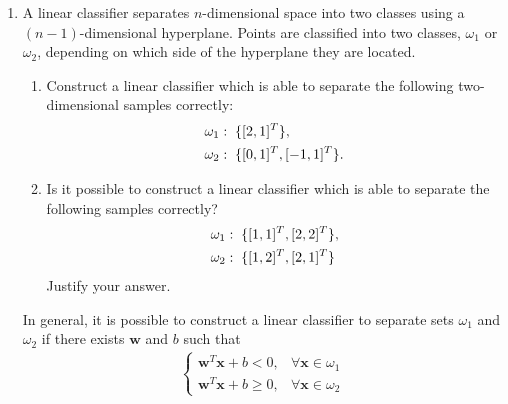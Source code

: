 \begin{enumerate}
\begin{solution}

  \end{solution}
  

\item A linear classifier separates $n$-dimensional
  space into two classes using a $(n-1)$-dimensional hyperplane. Points
  are classified into two classes, $\omega_1$ or $\omega_2$, depending on
  which side of the hyperplane they are located.
  \begin{enumerate}
  \item Construct a linear classifier which is able to separate the
    following two-dimensional samples correctly:
    \begin{align}
      &\omega_1: \text{\;} \{[2,1]^T\}, \notag \\
      &\omega_2: \text{\;} \{[0,1]^T, [-1,1]^T \}. \notag
    \end{align}
  \item Is it possible to construct a linear classifier which is able
    to separate the following samples correctly?
    \begin{align}
      &\omega_1:\text{\;} \{ [1,1]^T, [2,2]^T \}, \notag \\
      &\omega_2: \text{\;} \{ [1,2]^T,[2,1]^T \} \notag
    \end{align}
    Justify your answer.
  \end{enumerate}

  \begin{solution}

    In general, it is possible to construct a linear classifier to
    separate sets $\omega_1$ and $\omega_2$ if there exists
    $\mathbf{w}$ and $b$ such that
    \begin{align*}
      \begin{cases}
        \mathbf{w}^T\mathbf{x}+b<0, & \forall \mathbf{x} \in \omega_1
        \\
        \mathbf{w}^T\mathbf{x}+b\geq 0, & \forall \mathbf{x} \in \omega_2
      \end{cases}
    \end{align*}


\end{solution}
\end{enumerate}
